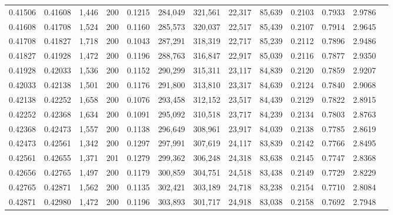 \begin{tabular}{rrrrrrrrrrrrr}
0.41506 & 0.41608 & 1,446 & 200 &                                     0.1215 & 284,049 & 321,561 &  22,317 &  85,639 & 0.2103 & 0.7933 & 2.9786 \\
0.41608 & 0.41708 & 1,524 & 200 &                                     0.1160 & 285,573 & 320,037 &  22,517 &  85,439 & 0.2107 & 0.7914 & 2.9645 \\
0.41708 & 0.41827 & 1,718 & 200 &                                     0.1043 & 287,291 & 318,319 &  22,717 &  85,239 & 0.2112 & 0.7896 & 2.9486 \\
0.41827 & 0.41928 & 1,472 & 200 &                                     0.1196 & 288,763 & 316,847 &  22,917 &  85,039 & 0.2116 & 0.7877 & 2.9350 \\
0.41928 & 0.42033 & 1,536 & 200 &                                     0.1152 & 290,299 & 315,311 &  23,117 &  84,839 & 0.2120 & 0.7859 & 2.9207 \\
0.42033 & 0.42138 & 1,501 & 200 &                                     0.1176 & 291,800 & 313,810 &  23,317 &  84,639 & 0.2124 & 0.7840 & 2.9068 \\
0.42138 & 0.42252 & 1,658 & 200 &                                     0.1076 & 293,458 & 312,152 &  23,517 &  84,439 & 0.2129 & 0.7822 & 2.8915 \\
0.42252 & 0.42368 & 1,634 & 200 &                                     0.1091 & 295,092 & 310,518 &  23,717 &  84,239 & 0.2134 & 0.7803 & 2.8763 \\
0.42368 & 0.42473 & 1,557 & 200 &                                     0.1138 & 296,649 & 308,961 &  23,917 &  84,039 & 0.2138 & 0.7785 & 2.8619 \\
0.42473 & 0.42561 & 1,342 & 200 &                                     0.1297 & 297,991 & 307,619 &  24,117 &  83,839 & 0.2142 & 0.7766 & 2.8495 \\
0.42561 & 0.42655 & 1,371 & 201 &                                     0.1279 & 299,362 & 306,248 &  24,318 &  83,638 & 0.2145 & 0.7747 & 2.8368 \\
0.42656 & 0.42765 & 1,497 & 200 &                                     0.1179 & 300,859 & 304,751 &  24,518 &  83,438 & 0.2149 & 0.7729 & 2.8229 \\
0.42765 & 0.42871 & 1,562 & 200 &                                     0.1135 & 302,421 & 303,189 &  24,718 &  83,238 & 0.2154 & 0.7710 & 2.8084 \\
0.42871 & 0.42980 & 1,472 & 200 &                                     0.1196 & 303,893 & 301,717 &  24,918 &  83,038 & 0.2158 & 0.7692 & 2.7948 \\

\end{tabular}
